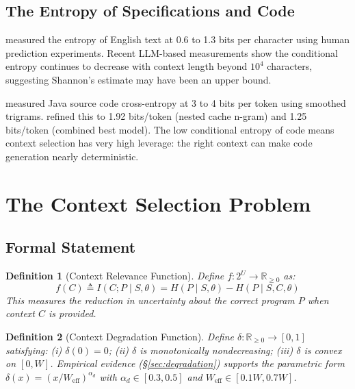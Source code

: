 \documentclass[11pt, a4paper, copyright]{googledeepmind}
\newtheorem{definition}{Definition}[section]
\begin{document}
\subsection{The Entropy of Specifications and Code}

\citet{shannon1951prediction} measured the entropy of English text at 0.6 to 1.3 bits per character using human prediction experiments. Recent LLM-based measurements \citep{bialek2025entropy} show the conditional entropy continues to decrease with context length beyond $10^4$ characters, suggesting Shannon's estimate may have been an upper bound.

\citet{hindle2012naturalness} measured Java source code cross-entropy at 3 to 4 bits per token using smoothed trigrams. \citet{hellendoorn2017deep} refined this to 1.92 bits/token (nested cache n-gram) and 1.25 bits/token (combined best model). The low conditional entropy of code means context selection has very high leverage: the right context can make code generation nearly deterministic.


\section{The Context Selection Problem}
\label{sec:context-selection}

\subsection{Formal Statement}

\begin{definition}[Context Relevance Function]
\label{def:relevance}
Define $f: 2^U \to \mathbb{R}_{\geq 0}$ as:
$$f(C) \triangleq I(C; P \mid S, \theta) = H(P \mid S, \theta) - H(P \mid S, C, \theta)$$
This measures the reduction in uncertainty about the correct program $P$ when context $C$ is provided.
\end{definition}

\begin{definition}[Context Degradation Function]
\label{def:degradation}
Define $\delta: \mathbb{R}_{\geq 0} \to [0, 1]$ satisfying: (i) $\delta(0) = 0$; (ii) $\delta$ is monotonically nondecreasing; (iii) $\delta$ is convex on $[0, W]$. Empirical evidence (\S\ref{sec:degradation}) supports the parametric form $\delta(x) = (x/W_{\text{eff}})^{\alpha_d}$ with $\alpha_d \in [0.3, 0.5]$ and $W_{\text{eff}} \in [0.1W, 0.7W]$.
\end{definition}
\end{document}
